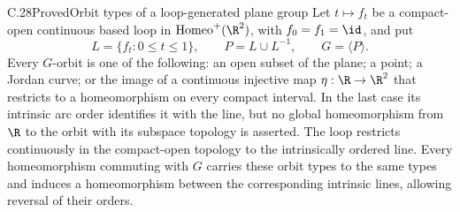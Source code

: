 \begin{claim}{C.28}{Proved}{Orbit types of a loop-generated plane group}
Let $t\mapsto f_t$ be a compact-open continuous based loop in
$\operatorname{Homeo}^+(\R^2)$, with $f_0=f_1=\id$, and put
\[
 L=\{f_t:0\leq t\leq1\},\qquad P=L\cup L^{-1},
 \qquad G=\langle P\rangle.
\]
Every $G$-orbit is one of the following: an open subset of the plane;
a point; a Jordan curve; or the image of a continuous injective map
$\eta:\R\to\R^2$ that restricts to a homeomorphism on every compact
interval. In the last case its intrinsic arc order identifies it with
the line, but no global homeomorphism from $\R$ to the orbit with its
subspace topology is asserted. The loop restricts continuously in the
compact-open topology to the intrinsically ordered line. Every
homeomorphism commuting with $G$ carries these orbit types to the same
types and induces a homeomorphism between the corresponding intrinsic
lines, allowing reversal of their orders.
\end{claim}
